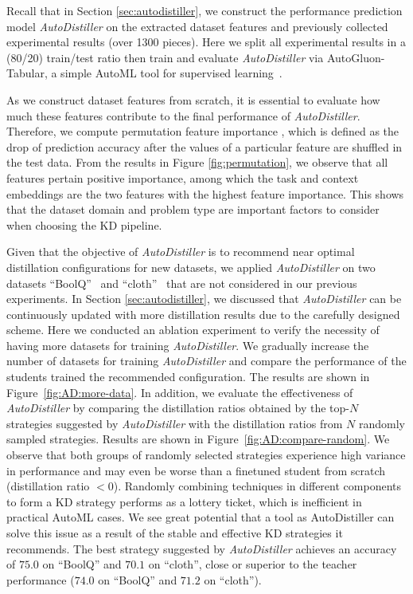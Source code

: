 \documentclass[11pt]{article}
\begin{document}
Recall that in Section \ref{sec:autodistiller}, we construct the performance prediction model \emph{AutoDistiller} on the extracted dataset features and previously collected experimental results (over 1300 pieces). Here we split all experimental results in a (80/20) train/test ratio then train and evaluate \emph{AutoDistiller} via AutoGluon-Tabular, a simple AutoML tool for supervised learning~\citep{erickson2020autogluon}. 

As we construct dataset features from scratch, it is essential to evaluate how much these features contribute to the final performance of \emph{AutoDistiller}. Therefore, we compute permutation feature importance \citep{breiman2001random}, which is defined as the drop of prediction accuracy after the values of a particular feature are shuffled in the test data. From the results in Figure \ref{fig:permutation}, we observe that all features pertain positive importance, among which the task and context embeddings are the two features with the highest feature importance. This shows that the dataset domain and problem type are important factors to consider when choosing the KD pipeline.

Given that the objective of \emph{AutoDistiller} is to recommend near optimal distillation configurations for new datasets, we applied \emph{AutoDistiller} on two datasets ``BoolQ''~\citep{wang2019superglue} and ``cloth''~\citep{shi2021multimodal} that are not considered in our previous experiments. In Section \ref{sec:autodistiller}, we discussed that \emph{AutoDistiller} can be continuously updated with more distillation results due to the carefully designed scheme. Here we conducted an ablation experiment to verify the necessity of having more datasets for training \emph{AutoDistiller}. We gradually increase the number of datasets for training \emph{AutoDistiller} and compare the performance of the students trained the recommended configuration. The results are shown in Figure~\ref{fig:AD:more-data}.
In addition, we evaluate the effectiveness of \emph{AutoDistiller} by comparing the distillation ratios obtained by the top-$N$ strategies suggested by \emph{AutoDistiller} with the distillation ratios from $N$ randomly sampled strategies. Results are shown in Figure~\ref{fig:AD:compare-random}. We observe that both groups of randomly selected strategies experience high variance in performance and may even be worse than a finetuned student from scratch (distillation ratio $<0$). Randomly combining techniques in different components to form a KD strategy performs as a lottery ticket, which is inefficient in practical AutoML cases. We see great potential that a tool as AutoDistiller can solve this issue as a result of the stable and effective KD strategies it recommends. The best strategy suggested by \emph{AutoDistiller} achieves an accuracy of $75.0$ on ``BoolQ'' and $70.1$ on ``cloth'', close or superior to the teacher performance ($74.0$ on ``BoolQ'' and $71.2$ on ``cloth'').
\end{document}
